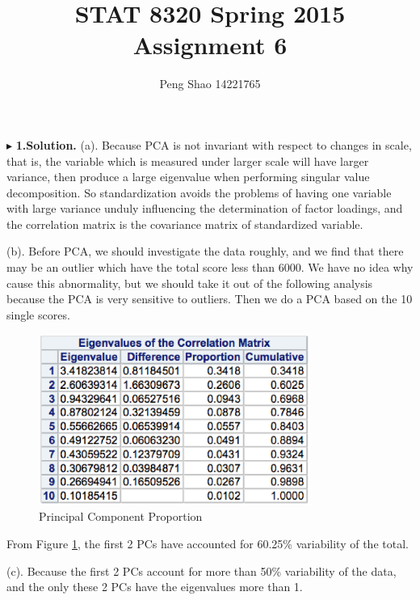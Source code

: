 \documentclass[letterpaper, 12pt]{article}
\begin{document}
\title{STAT 8320 Spring 2015 Assignment 6}
\author{Peng Shao 14221765}
\maketitle
\indent




$\blacktriangleright$ \textbf{1.\quad Solution.} 
(a). Because PCA is not invariant with respect to changes in scale, that is, the variable which is measured under larger scale will have larger variance, then produce a large eigenvalue when performing singular value decomposition. So standardization avoids the problems of having one variable with large variance unduly influencing the determination of factor loadings, and the correlation matrix is the covariance matrix of standardized variable.

(b). Before PCA, we should investigate the data roughly, and we find that there may be an outlier which have the total score less than 6000. We have no idea why cause this abnormality, but we should take it out of the following analysis because the PCA is very sensitive to outliers. Then we do a PCA based on the 10 single scores.

\begin{figure}[htbp]
\centering\includegraphics[width=3.5in]{7-1.eps}
\caption{Principal Component Proportion}\label{1}
\end{figure}

From Figure \ref{1}, the first 2 PCs have accounted for 60.25\% variability of the total.


(c).
Because the first 2 PCs account for more than 50\% variability of the data, and the only these 2 PCs have the eigenvalues more than 1.
\end{document}
